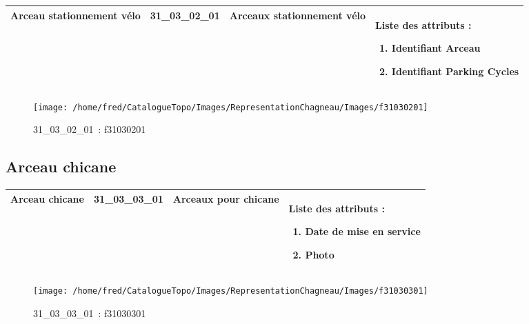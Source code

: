 \documentclass[12pt,titlepage]{book}
\begin{document}
\renewcommand{\arraystretch}{1.2}
\begin{supertabular}{|p{10cm}|c|p{13cm}|p{12cm}|}
 Arceau stationnement vélo & 31\_03\_02\_01 & Arceaux stationnement vélo & Liste des attributs :
\begin{enumerate}
  \item Identifiant Arceau  \item Identifiant Parking Cycles\end{enumerate}
\\
\hline
\end{supertabular}
\begin{figure}[h!]
  \hfill         %
  \begin{minipage}[t]{3cm}
    \begin{center}
      \texttt{[image: /home/fred/CatalogueTopo/Images/RepresentationChagneau/Images/f31030201]}
      \caption[~31\_03\_02\_01]{\small{31\_03\_02\_01~:} \tiny{f31030201}}\label{f31030201}
    \end{center}
  \end{minipage}
\end{figure}


\subsection{Arceau chicane}
\noindent
\vspace{\baselineskip}

\renewcommand{\arraystretch}{1.2}
\begin{supertabular}{|p{10cm}|c|p{13cm}|p{12cm}|}
 Arceau chicane & 31\_03\_03\_01 & Arceaux pour chicane & Liste des attributs :
\begin{enumerate}
  \item Date de mise en service  \item Photo\end{enumerate}
\\
\hline
\end{supertabular}
\begin{figure}[h!]
  \hfill         %
  \begin{minipage}[t]{3cm}
    \begin{center}
      \texttt{[image: /home/fred/CatalogueTopo/Images/RepresentationChagneau/Images/f31030301]}
      \caption[~31\_03\_03\_01]{\small{31\_03\_03\_01~:} \tiny{f31030301}}\label{f31030301}
    \end{center}
  \end{minipage}
\end{figure}
\end{document}
